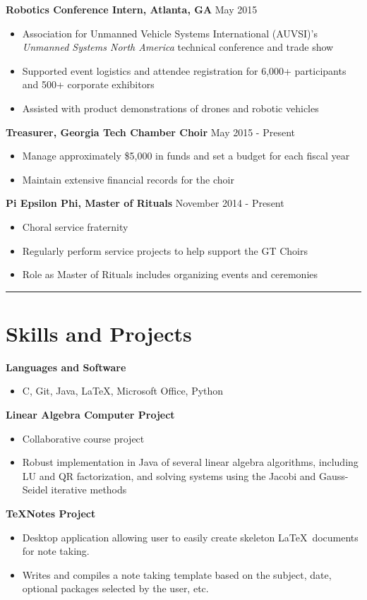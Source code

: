 \documentclass[11pt]{article}
\begin{document}
\textbf{Robotics Conference Intern, Atlanta, GA} \hfill May 2015
\begin{itemize}
\setlength\itemsep{0.5pt}
    \item Association for Unmanned Vehicle Systems International (AUVSI)'s \emph{Unmanned Systems North America} technical conference and trade show
    \item Supported event logistics and attendee registration for 6,000+ participants and 500+ corporate exhibitors
    \item Assisted with product demonstrations of drones and robotic vehicles
\end{itemize}

\textbf{Treasurer, Georgia Tech Chamber Choir} \hfill May 2015 - Present
\begin{itemize}
\setlength\itemsep{0.5pt}
    \item Manage approximately \$5,000 in funds and set a budget for each fiscal year
    \item Maintain extensive financial records for the choir
\end{itemize}

\textbf{Pi Epsilon Phi, Master of Rituals} \hfill November 2014 - Present
\begin{itemize}
\setlength\itemsep{0.5pt}
    \item Choral service fraternity
    \item Regularly perform service projects to help support the GT Choirs
    \item Role as Master of Rituals includes organizing events and ceremonies
\end{itemize}

\rule{\textwidth}{.5pt}

\section*{Skills and Projects}
\textbf{Languages and Software}
\begin{itemize}
\setlength\itemsep{0.5pt}
    \item C, Git, Java, \LaTeX, Microsoft Office, Python
\end{itemize}

\textbf{Linear Algebra Computer Project}
\begin{itemize}
\setlength\itemsep{0.5pt}
    \item Collaborative course project
    \item Robust implementation in Java of several linear algebra algorithms, including LU and QR factorization, and solving systems using the Jacobi and Gauss-Seidel iterative methods
\end{itemize}

\textbf{TeXNotes Project}
\begin{itemize}
\setlength\itemsep{0.5pt}
    \item Desktop application allowing user to easily create skeleton \LaTeX\ documents for note taking.
    \item Writes and compiles a note taking template based on the subject, date, optional packages selected by the user, etc. 
\end{itemize}
\end{document}
